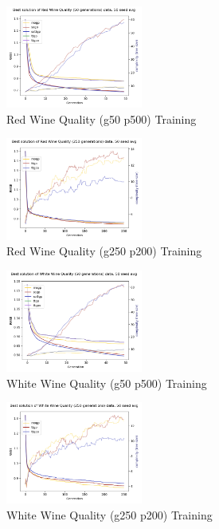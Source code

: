 \documentclass[a4paper, twocolumn]{article}
\begin{document}
\begin{figure}[t]
	\caption{Red Wine Quality (g50 p500) Training}
	\includegraphics[width=0.40\textwidth]{Red Wine Quality (50 generations)-besttrain-evo}
\end{figure}
\begin{figure}[t]
	\caption{Red Wine Quality (g250 p200) Training}
	\includegraphics[width=0.40\textwidth]{Red Wine Quality (250 generations)-besttrain-evo}
\end{figure}
\begin{figure}[t]
	\caption{White Wine Quality (g50 p500) Training}
	\includegraphics[width=0.40\textwidth]{White Wine Quality (50 generations)-besttrain-evo}
\end{figure}
\begin{figure}[t]
	\caption{White Wine Quality (g250 p200) Training}
	\includegraphics[width=0.40\textwidth]{White Wine Quality (250 generations)-besttrain-evo}
\end{figure}
\end{document}
